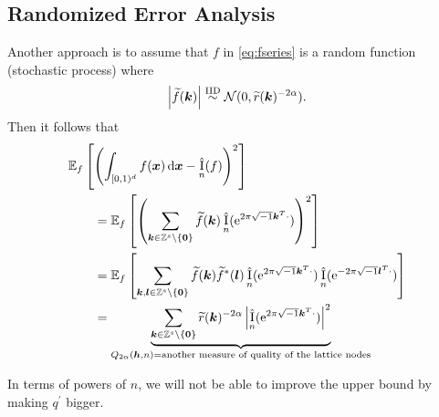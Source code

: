 \documentclass[authoryear]{elsarticle}
\newcommand{\tr}{\widetilde{r}}
\newcommand{\appxintn}{\appxint_n}
\DeclareMathOperator{\appxint}{\hat{I}}
\begin{document}
\subsection{Randomized Error Analysis}
Another approach is to assume that $f$ in \eqref{eq:fseries} is a random function (stochastic process) where
\begin{equation}
    \abs{\tf(\vk)} \IIDsim \cn(0,\tr(\vk)^{-2\alpha}).
\end{equation}
Then it follows that
\begin{align*}
    \MoveEqLeft{\Ex_f\left[\left(\int_{[0,1)^d} f(\vx) \, \dif \vx - \appxintn(f) \right)^2\right]} \\
    & =
    \Ex_f\left[\left(\sum_{\vk \in \integers^s \setminus\{\vzero\}} \tf(\vk) \appxintn(\me^{2 \pi \sqrt{-1} \vk^T \cdot})\right)^2\right] \\
     & =
    \Ex_f\left[\sum_{\vk,\vl \in \integers^s \setminus\{\vzero\}} \tf(\vk) \tf^*(\vl) \appxintn(\me^{2 \pi \sqrt{-1} \vk^T \cdot}) \appxintn(\me^{-2 \pi \sqrt{-1} \vl^T \cdot})\right] \\
    & = \underbrace{\sum_{\vk\in \integers^s \setminus\{\vzero\}} \tr(\vk)^{-2\alpha} \abs{\appxintn(\me^{2 \pi \sqrt{-1} \vk^T \cdot})}^2}_{Q_{2\alpha}(\vh,n) = \text{another measure of quality of the lattice nodes}}  \\
\end{align*}

In terms of powers of $n$, we will not be able to improve the upper bound by making $q^{'}$ bigger. 





\end{document}
